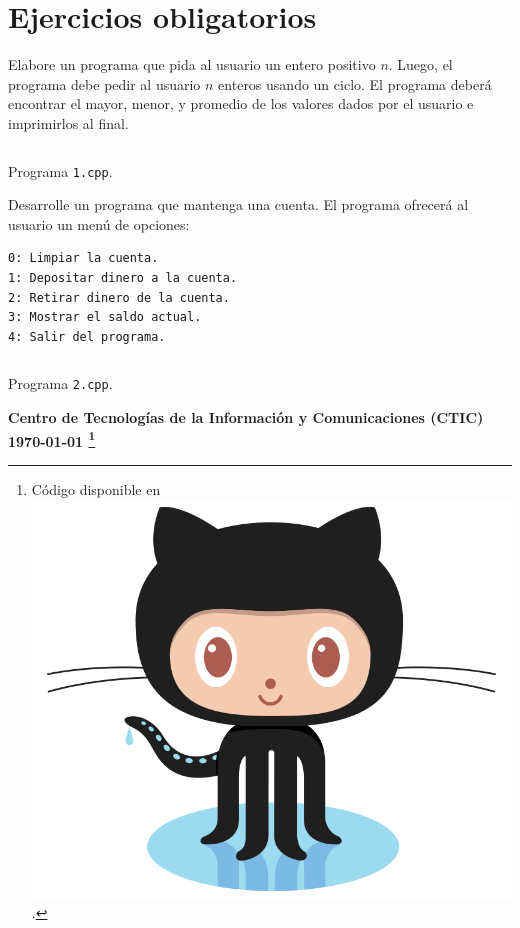\documentclass[spanish,addpoints,answers,a4paper]{exam}
\newcommand{\unmarkedfntext}[1]{%
	\begingroup
	\renewcommand\thefootnote{}\footnote{#1}%
	\addtocounter{footnote}{-1}%
	\endgroup
}
\newcommand{\mychar}{%
	\begingroup\normalfont
	\includegraphics[height=\fontcharht\font`\B]{Octocat.png}%
	\endgroup
}
\begin{document}
%
%
%

\section*{Ejercicios obligatorios}

\begin{questions}

\question Elabore un programa que pida al usuario un entero positivo $n$. Luego, el programa debe pedir al usuario $n$ enteros usando un ciclo. El programa deberá encontrar el mayor, menor, y promedio de los valores dados por el usuario e imprimirlos al final.

\begin{solution}
	\begin{listing}[H]
		\footnotesize
		\inputminted{cpp}{1.cpp}
		\caption{Programa \texttt{1.cpp}.}
		\label{lst:1.9}
\end{listing}
\end{solution}

\question Desarrolle un programa que mantenga una cuenta. El programa ofrecerá al usuario un menú de opciones:

\begin{verbatim}
0: Limpiar la cuenta.
1: Depositar dinero a la cuenta.
2: Retirar dinero de la cuenta.
3: Mostrar el saldo actual.
4: Salir del programa.
\end{verbatim}

\begin{solution}
	\begin{listing}[H]
		\footnotesize
		\inputminted{cpp}{2.cpp}
		\caption{Programa \texttt{2.cpp}.}
		\label{lst:1.10}
\end{listing}
\end{solution}

\end{questions}

\begin{flushright}\bfseries
Centro de Tecnologías de la Información y Comunicaciones (CTIC)\\[2mm]
\today\unmarkedfntext{Código disponible en \href{https://github.com/carlosal1015/Cpp-Programming}{\mychar{}}.}
\end{flushright}
\end{document}
